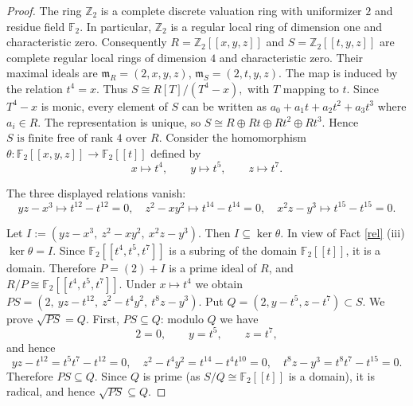 \documentclass[10pt,a4paper]{amsart}
\theoremstyle{definition}
\theoremstyle{remark}
\begin{document}
\begin{proof}
	
	
The ring $\mathbb Z_2$ is a complete discrete valuation ring with
 uniformizer $2$ and residue field $\mathbb F_2$.  In particular,
 $\mathbb Z_2$ is a regular local ring of dimension one and
 characteristic zero.
 Consequently
 \(
 R=\mathbb Z_2[[x,y,z]]
 \)
 and
 \(
 S=\mathbb Z_2[[t,y,z]]
 \)
 are complete regular local rings of dimension $4$ and characteristic
 zero.  Their maximal ideals are
 \(
 \mathfrak m_R=(2,x,y,z) \),
 \( \mathfrak m_S=(2,t,y,z).
 \)
The map is induced by the relation
 \(
 t^4=x.
 \)
 Thus
 \(
 S\cong R[T]/(T^4-x),
 \)
 with $T$ mapping to $t$.
 Since $T^4-x$ is monic, every element of $S$ can be written as
 \(
 a_0+a_1t+a_2t^2+a_3t^3\)
where  \(a_i\in R.
 \)
 The representation is unique, so
 \(
 S\cong R\oplus Rt\oplus Rt^2\oplus Rt^3.
 \)
  Hence
 \(
 {S\text{ is finite free of rank }4\text{ over }R.}
 \)
Consider the homomorphism
\(
\theta:\mathbb F_2[[x,y,z]]
\to
\mathbb F_2[[t]]
\)
defined by
\[
x\longmapsto t^4,\qquad
y\longmapsto t^5,\qquad
z\longmapsto t^7.
\]

The three displayed relations vanish:
\[
yz-x^3
\longmapsto
t^{12}-t^{12}=0,
\quad
z^2-xy^2
\longmapsto
t^{14}-t^{14}=0,
\quad
x^2z-y^3
\longmapsto
t^{15}-t^{15}=0.
\]

Let
\(
I:=(yz-x^3,\ z^2-xy^2,\ x^2z-y^3).
\)
Then
\(
I\subseteq\ker\theta.
\)
In view of {Fact} \ref{rel} (iii)
\(
\ker\theta=I.
\)
Since \(\mathbb F_2[[t^4,t^5,t^7]]\) is a subring of the domain
\(\mathbb F_2[[t]]\), it is a domain. 
Therefore
\(
P=(2)+I
\)
is a prime ideal of \(R\), and
\(
R/P\cong\mathbb F_2[[t^4,t^5,t^7]].
\)
Under \(x\mapsto t^4\) we obtain
\(
PS=
(2,\ yz-t^{12},\ z^2-t^4y^2,\ t^8z-y^3).
\)
Put
\(
Q=(2,y-t^5,z-t^7)\subset S.
\)
We prove
\(
\sqrt{PS}=Q.
\)
First, \(PS\subseteq Q\): modulo \(Q\) we have
\[
2=0,\qquad y=t^5,\qquad z=t^7,
\]
and hence
\[
yz-t^{12}=t^5t^7-t^{12}=0,
\quad
z^2-t^4y^2=t^{14}-t^4t^{10}=0,
\quad
t^8z-y^3=t^8t^7-t^{15}=0.
\]
Therefore
\(
PS\subseteq Q.
\)
Since \(Q\) is prime (as \(S/Q\cong\mathbb F_2[[t]]\) is a domain),
it is radical, and hence
\(
\sqrt{PS}\subseteq Q.
\)


\end{proof}
\end{document}
